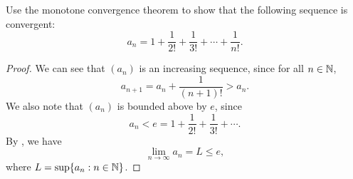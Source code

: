 \begin{problem}
  Use the monotone convergence theorem to show that the following sequence is convergent:
  \[
    a_{n} = 1 + \frac{1}{2!} + \frac{1}{3!} + \cdots + \frac{1}{n!}.
  \]

  \begin{proof}
    We can see that $(a_{n})$ is an increasing sequence, since for all $n \in \mathbb{N}$,
    \[
      a_{n+1} = a_{n} + \frac{1}{(n+1)!} > a_{n}.
    \]
    We also note that $(a_{n})$ is bounded above by $e$, since
    \[
      a_{n} < e = 1 + \frac{1}{2!} + \frac{1}{3!} + \cdots.
    \]
    By , we have
    \[
      \lim_{n \to \infty} a_{n} = L \leq e,
    \]
    where $L = \sup \{ a_{n} : n \in \mathbb{N}\}$.
  \end{proof}
\end{problem}

